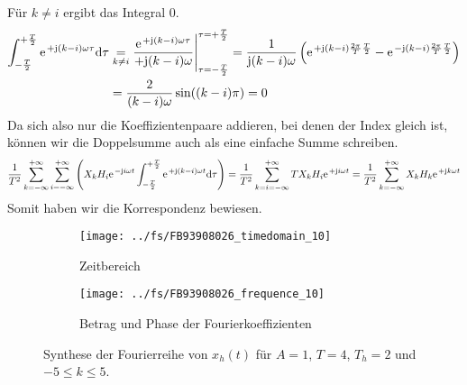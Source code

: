 \documentclass[11pt,a4paper,DIV=12]{scrartcl}
\newcommand{\diff}{\mathrm{d}}
\begin{document}
%
%
Für $k\neq i$ ergibt das Integral $0$.
%
%
\begin{align}
	\int_{-\frac{T}{2}}^{+\frac{T}{2}}\e^{+\im (k-i)\omega \tau}\diff \tau &\underset{k\neq i}{=}\frac{\e^{+\im (k-i)\omega \tau}}{+\im (k-i)\omega}\Bigg |_{\tau=-\frac{T}{2}}^{\tau=+\frac{T}{2}}
	=\frac{1}{\im (k-i)\omega }\left (\e^{+\im (k-i)\frac{2\pi}{T}\frac{T}{2}}-\e^{-\im (k-i)\frac{2\pi}{T}\frac{T}{2}}\right )\nonumber \\
	&=\frac{2}{ (k-i)\omega}\sin((k-i)\pi)=0
\end{align}
%
%
Da sich also nur die Koeffizientenpaare addieren, bei denen der Index gleich ist, können wir die Doppelsumme auch als eine einfache Summe schreiben.
%
%
\begin{align}
	\frac{1}{T^2}\sum_{k=-\infty}^{+\infty}\sum_{i=-\infty}^{+\infty}\left (X_kH_i\e^{-\im i \omega t}\int_{-\frac{T}{2}}^{+\frac{T}{2}}\e^{+\im (k-i)\omega t}\diff \tau \right )
	=\frac{1}{T^2}\sum_{k=i=-\infty}^{+\infty}TX_kH_i\e^{+\im i\omega t}
	=\frac{1}{T^2}\sum_{k=-\infty}^{+\infty}X_kH_k\e^{+\im k \omega t}
\end{align}
Somit haben wir die Korrespondenz bewiesen.
%
%
\begin{figure}
	\centering
	\begin{subfigure}{\textwidth}
		\texttt{[image: ../fs/FB93908026\_timedomain\_10]}
		\caption{Zeitbereich}
	\end{subfigure}
	\begin{subfigure}{\textwidth}
		\texttt{[image: ../fs/FB93908026\_frequence\_10]}
		\caption{Betrag und Phase der Fourierkoeffizienten}
	\end{subfigure}
	\caption{Synthese der Fourierreihe von $x_h(t)$ für $A=1$, $T=4$, $T_h=2$ und
		$-5\leq k\leq5$.}
\end{figure}
%
%
\newpage
\end{document}
